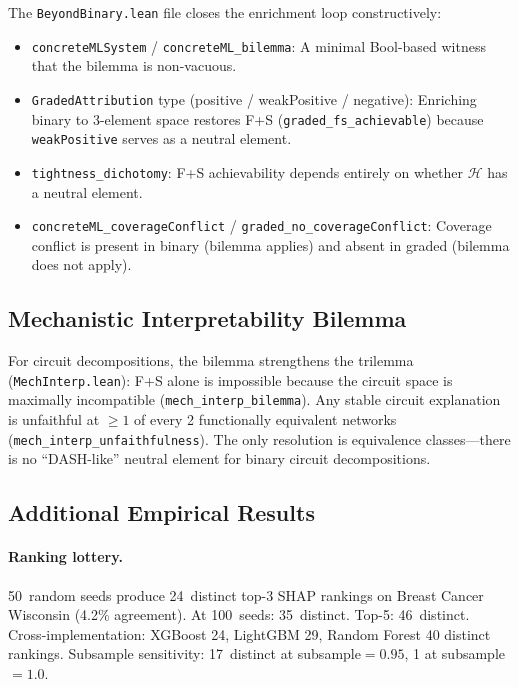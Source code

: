 \documentclass[11pt,a4paper]{article}
\begin{document}
The \texttt{BeyondBinary.lean} file closes the enrichment loop constructively:

\begin{itemize}
  \item \texttt{concreteMLSystem} / \texttt{concreteML\_bilemma}: A minimal Bool-based witness that the bilemma is non-vacuous.
  \item \texttt{GradedAttribution} type (positive / weakPositive / negative): Enriching binary to 3-element space restores F+S (\texttt{graded\_fs\_achievable}) because \texttt{weakPositive} serves as a neutral element.
  \item \texttt{tightness\_dichotomy}: F+S achievability depends entirely on whether $\mathcal{H}$ has a neutral element.
  \item \texttt{concreteML\_coverageConflict} / \texttt{graded\_no\_coverageConflict}: Coverage conflict is present in binary (bilemma applies) and absent in graded (bilemma does not apply).
\end{itemize}

\subsection{Mechanistic Interpretability Bilemma}

For circuit decompositions, the bilemma strengthens the trilemma (\texttt{MechInterp.lean}): F+S alone is impossible because the circuit space is maximally incompatible (\texttt{mech\_interp\_bilemma}).  Any stable circuit explanation is unfaithful at $\geq 1$ of every 2 functionally equivalent networks (\texttt{mech\_interp\_unfaithfulness}).  The only resolution is equivalence classes---there is no ``DASH-like'' neutral element for binary circuit decompositions.

\subsection{Additional Empirical Results}

\paragraph{Ranking lottery.}
50~random seeds produce 24~distinct top-3 SHAP rankings on Breast Cancer Wisconsin (4.2\% agreement).  At 100~seeds: 35~distinct.  Top-5: 46~distinct.  Cross-implementation: XGBoost 24, LightGBM 29, Random Forest 40 distinct rankings.  Subsample sensitivity: 17~distinct at subsample$= 0.95$, 1 at subsample$= 1.0$.
\end{document}
